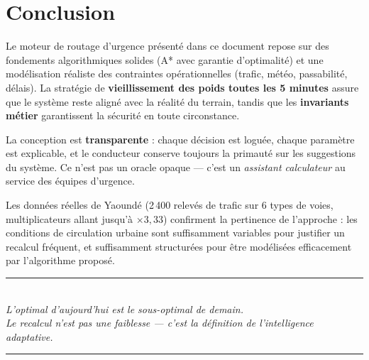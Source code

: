 \documentclass[12pt,a4paper]{article}
\theoremstyle{definition}
\theoremstyle{remark}
\begin{document}
\section*{Conclusion}

Le moteur de routage d'urgence présenté dans ce document repose sur des
fondements algorithmiques solides (A* avec garantie d'optimalité) et une
modélisation réaliste des contraintes opérationnelles (trafic, météo,
passabilité, délais). La stratégie de \textbf{vieillissement des poids
toutes les 5 minutes} assure que le système reste aligné avec la réalité
du terrain, tandis que les \textbf{invariants métier} garantissent la
sécurité en toute circonstance.

\medskip
La conception est \textbf{transparente} : chaque décision est loguée,
chaque paramètre est explicable, et le conducteur conserve toujours la
primauté sur les suggestions du système. Ce n'est pas un oracle opaque
— c'est un \emph{assistant calculateur} au service des équipes d'urgence.

\medskip
Les données réelles de Yaoundé (2\,400 relevés de trafic sur 6 types de
voies, multiplicateurs allant jusqu'à $\times 3{,}33$) confirment la
pertinence de l'approche : les conditions de circulation urbaine sont
suffisamment variables pour justifier un recalcul fréquent, et suffisamment
structurées pour être modélisées efficacement par l'algorithme proposé.

\vspace{2em}
\begin{center}
{\color{urgence}\rule{0.5\linewidth}{1pt}}\\[0.5em]
{\itshape \og{}L'optimal d'aujourd'hui est le sous-optimal de demain.\\
Le recalcul n'est pas une faiblesse — c'est la définition de l'intelligence adaptative.\fg{}}\\[0.5em]
{\color{urgence}\rule{0.5\linewidth}{1pt}}
\end{center}
\end{document}
